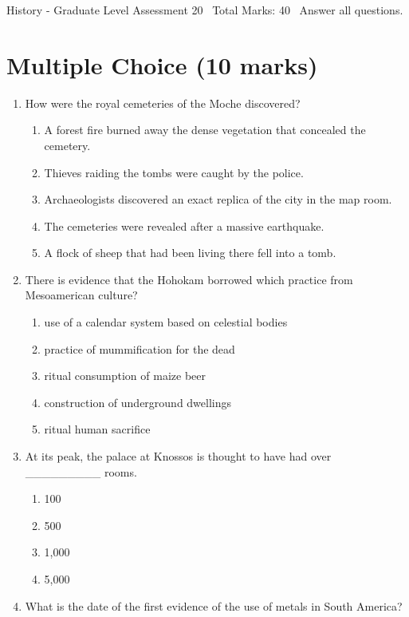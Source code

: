 \documentclass[12pt]{article}
\begin{document}
\begin{center}
History - Graduate Level Assessment 20 \
Total Marks: 40 \
Answer all questions.
\end{center}

\section*{Multiple Choice (10 marks)}
\begin{enumerate}[label=\arabic*.]
\item How were the royal cemeteries of the Moche discovered?
\begin{enumerate}[label=(\alph*)]
    \item A forest fire burned away the dense vegetation that concealed the cemetery.
    \item Thieves raiding the tombs were caught by the police.
    \item Archaeologists discovered an exact replica of the city in the map room.
    \item The cemeteries were revealed after a massive earthquake.
    \item A flock of sheep that had been living there fell into a tomb.
\end{enumerate}
\item There is evidence that the Hohokam borrowed which practice from Mesoamerican culture?
\begin{enumerate}[label=(\alph*)]
    \item use of a calendar system based on celestial bodies
    \item practice of mummification for the dead
    \item ritual consumption of maize beer
    \item construction of underground dwellings
    \item ritual human sacrifice
\end{enumerate}
\item At its peak, the palace at Knossos is thought to have had over \_\_\_\_\_\_\_\_\_ rooms.
\begin{enumerate}[label=(\alph*)]
    \item 100
    \item 500
    \item 1,000
    \item 5,000
\end{enumerate}
\item What is the date of the first evidence of the use of metals in South America?

\end{enumerate}
\end{document}
